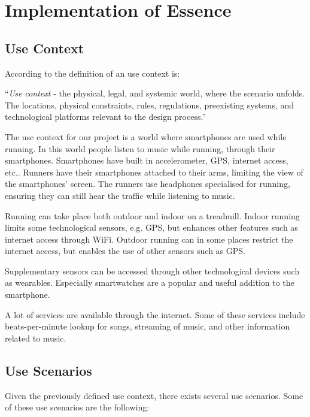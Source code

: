 \section{Implementation of Essence}



\subsection{Use Context}
According to \cite[page 83]{essence} the definition of an use context is:
\begin{center}
	“\textit{Use context} - the physical, legal, and systemic world, where the scenario unfolds.
	 The locations, physical constraints, rules, regulations, preexisting systems, and technological platforms relevant to the design process.”
\end{center}

The use context for our project is a world where smartphones are used while running.
In this world people listen to music while running, through their smartphones.
Smartphones have built in accelerometer, GPS, internet access, etc..
Runners have their smartphones attached to their arms, limiting the view of the smartphones' screen.
The runners use headphones specialised for running, ensuring they can still hear the traffic while listening to music.

Running can take place both outdoor and indoor on a treadmill.
Indoor running limits some technological sensors, e.g. GPS, but enhances other features such as internet access through WiFi.
Outdoor running can in some places restrict the internet access, but enables the use of other sensors such as GPS.

Supplementary sensors can be accessed through other technological devices such as wearables.
Especially smartwatches are a popular and useful addition to the smartphone.

A lot of services are available through the internet.
Some of these services include beats-per-minute lookup for songs, streaming of music, and other information related to music.


\subsection{Use Scenarios}
Given the previously defined use context, there exists several use scenarios.
Some of these use scenarios are the following:

